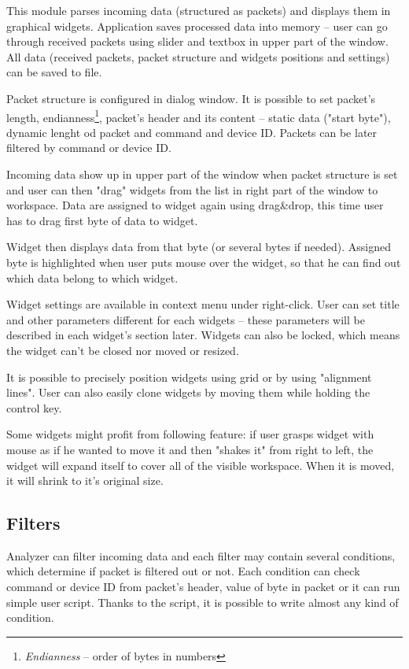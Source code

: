 \documentclass[12pt, a4paper, oneside]{article}
\newcommand{\It}{\textit}  %
\begin{document}
This module parses incoming data (structured as packets) and displays them in graphical widgets. Application saves processed data into memory -- user can go through received packets using slider and textbox in upper part of the window. All data (received packets, packet structure and widgets positions and settings) can be saved to file. 

Packet structure is configured in dialog window. It is possible to set packet's length, endianness\footnote{\It{Endianness} -- order of bytes in numbers}, packet's header and its content -- static data ("start byte"), dynamic lenght od packet and command and device ID. Packets can be later filtered by command or device ID.

Incoming data show up in upper part of the window when packet structure is set and user can then "drag" widgets from the list in right part of the window to workspace. Data are assigned to widget again using drag\&drop, this time user has to drag first byte of data to widget.

Widget then displays data from that byte (or several bytes if needed). Assigned byte is highlighted when user puts mouse over the widget, so that he can find out which data belong to which widget.

Widget settings are available in context menu under right-click. User can set title and other parameters different for each widgets -- these parameters will be described in each widget's section later. Widgets can also be locked, which means the widget can't be closed nor moved or resized.

It is possible to precisely position widgets using grid or by using "alignment lines". User can also easily clone widgets by moving them while holding the control key.

Some widgets might profit from following feature: if user grasps widget with mouse as if he wanted to move it and then "shakes it" from right to left, the widget will expand itself to cover all of the visible workspace. When it is moved, it will shrink to it's original size.

\subsection{Filters}
Analyzer can filter incoming data and each filter may contain several conditions, which determine if packet is filtered out or not. Each condition can check command or device ID from packet's header, value of byte in packet or  it can run simple user script. Thanks to the script, it is possible to write almost any kind of condition.
\end{document}
